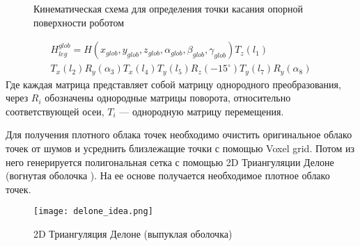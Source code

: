 \begin{figure}[H]
    \caption{Кинематическая схема для определения точки касания опорной поверхности роботом}
    \label{fig:StriRus_10_legs_15_angle_v4.png}
\end{figure}

\begin{multline}
    \label{eq:forw_kin}
        H_{leg}^{glob} = H(x_{glob},y_{glob},z_{glob},\alpha_{glob},\beta_{glob},\gamma_{glob})T_z(l_1)\\ T_x(l_2)R_y(\alpha_3)T_x(l_4)T_y(l_5)R_z(-15^{\circ})T_y(l_7)R_y(\alpha_8)
\end{multline}
Где каждая матрица представляет собой матрицу однородного преобразования, через $R_i$ обозначены однородные матрицы поворота, относительно соответствующей осеи, $T_i$ --- однородную матрицу перемещения.

Для получения плотного облака точек необходимо очистить оригинальное облако точек от шумов и усреднить близлежащие точки с помощью Voxel grid. Потом из него генерируется полигональная сетка с помощью 2D Триангуляции Делоне  (вогнутая оболочка ). На ее основе получается необходимое плотное облако точек. 

\begin{figure}[ht!]
    \centering\texttt{[image: delone\_idea.png]}
    \caption{2D Триангуляция Делоне (выпуклая оболочка)}
    \label{fig:delone_idea.png}
\end{figure}

